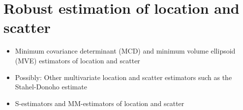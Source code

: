 \chapter{Robust estimation of location and scatter}
\label{chap:mcd}

\begin{itemize}
\item
    Minimum covariance determinant (MCD) and minimum volume ellipsoid (MVE) estimators of location and scatter
\item
    Possibly: Other multivariate location and scatter estimators such as the
    Stahel-Donoho estimate
\item
    S-estimators and MM-estimators of location and scatter
\end{itemize}


\endinput
